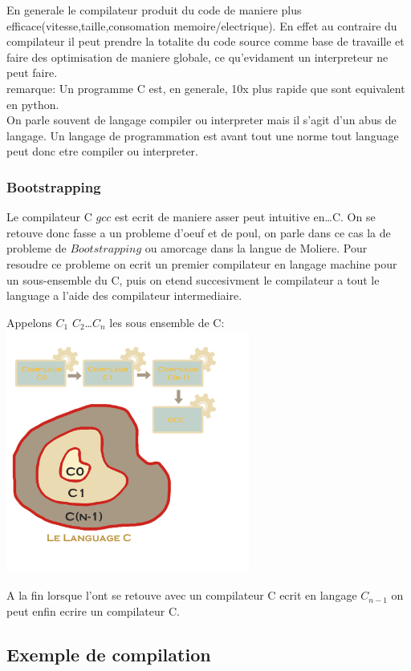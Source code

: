 \documentclass[a4paper,11pt]{article}
\begin{document}
    En generale le compilateur produit du code de maniere plus efficace(vitesse,taille,consomation memoire/electrique).
    En effet au contraire du compilateur il peut prendre la totalite du code source comme base de travaille et faire des optimisation de maniere globale, ce qu'evidament un interpreteur ne peut faire.\\
    remarque: Un programme C est, en generale, 10x plus rapide que sont equivalent en python.\\

    On parle souvent de langage compiler ou interpreter mais il s'agit d'un abus de langage. Un langage de programmation est avant tout une norme tout language peut donc etre compiler ou interpreter.
    \subsubsection{Bootstrapping}
    Le compilateur C $gcc$ est ecrit de maniere asser peut intuitive en\dots C.
    On se retouve donc fasse a un probleme d'oeuf et de poul, on parle dans ce cas la de probleme de $Bootstrapping$ ou amorcage dans la langue de Moliere.
    Pour resoudre ce probleme on ecrit un premier compilateur en langage machine pour un sous-ensemble du C, puis on etend succesivment le compilateur a tout le language a l'aide des compilateur intermediaire.
    \begin{center}
      Appelons $C_1$ $C_2$\ldots $C_n$ les sous ensemble de C:\\
     \hfill\includegraphics[width=8cm]{fig2.png}\hspace*{\fill}
    \end{center}
    A la fin lorsque l'ont se retouve avec un compilateur C ecrit en langage $C_{n-1}$ on peut enfin ecrire un compilateur C.
    \subsection{Exemple de compilation}
\end{document}
